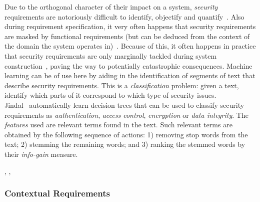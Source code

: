 Due to the orthogonal character of their impact on a system, \emph{security}
requirements are notoriously difficult to identify, objectify and
quantify~\cite{}. Also during requirement specification, it very often
happens that security requirements are masked by functional requirements
(but can be deduced from the context of the domain the system operates
in)~\cite{Riaz:2014}. Because of this, it often happens in practice that
security requirements are only marginally tackled during system
construction~\cite{}, paving the way to potentially catastrophic consequences.
Machine learning can be of use here by aiding in the identification of segments
of text that describe security requirements. This is a \emph{classification}
problem: given a text, identify which parts of it correspond to which
type of security issues.\\

Jindal\etal~\cite{Jildal:2016} automatically learn decision trees that can be
used to classify security requirements as \emph{authentication}, \emph{access
control}, \emph{encryption} or \emph{data integrity}. The \emph{features} used
are relevant terms found in the text. Such relevant terms are obtained by the
following sequence of actions: 1) removing stop words from the text; 2) stemming
the remaining words; and 3) ranking the stemmed words by their \emph{info-gain}
measure.

\cite{Jildal:2016}, \cite{Riaz:2014}, \cite{Knauss:2011} 

\subsubsection{Contextual Requirements} 


